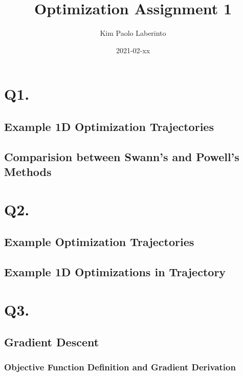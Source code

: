 \documentclass{article}
\title{Optimization Assignment 1}
\date{2021-02-xx}
\author{Kim Paolo Laberinto}
\begin{document}
    \maketitle
    \newpage

    \tableofcontents
    \newpage

    \section{Q1.}

    \subsection{Example 1D Optimization Trajectories}



    \subsection{Comparision between Swann's and Powell's Methods}

    \section{Q2.}

    \subsection{Example Optimization Trajectories}

    \subsection{Example 1D Optimizations in Trajectory}

    \section{Q3.}

    \subsection{Gradient Descent}

    \subsubsection{Objective Function Definition and Gradient Derivation}
\end{document}
